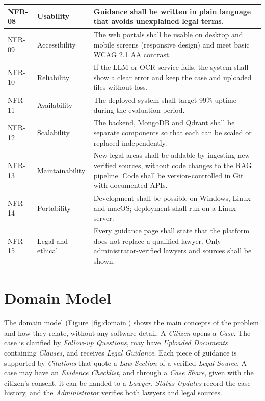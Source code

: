 \documentclass[12pt,a4paper]{report}
\begin{document}
\begin{longtable}{|p{1.5cm}|L{2.6cm}|L{10.1cm}|}
NFR-08 & Usability & Guidance shall be written in plain language that avoids unexplained legal terms. \\ \hline
NFR-09 & Accessibility & The web portals shall be usable on desktop and mobile screens (responsive design) and meet basic WCAG 2.1 AA contrast. \\ \hline
NFR-10 & Reliability & If the LLM or OCR service fails, the system shall show a clear error and keep the case and uploaded files without loss. \\ \hline
NFR-11 & Availability & The deployed system shall target 99\% uptime during the evaluation period. \\ \hline
NFR-12 & Scalability & The backend, MongoDB and Qdrant shall be separate components so that each can be scaled or replaced independently. \\ \hline
NFR-13 & Maintainability & New legal areas shall be addable by ingesting new verified sources, without code changes to the RAG pipeline. Code shall be version-controlled in Git with documented APIs. \\ \hline
NFR-14 & Portability & Development shall be possible on Windows, Linux and macOS; deployment shall run on a Linux server. \\ \hline
NFR-15 & Legal and ethical & Every guidance page shall state that the platform does not replace a qualified lawyer. Only administrator-verified lawyers and sources shall be shown. \\ \hline
\end{longtable}

\section{Domain Model}\label{sec:domain}
The domain model (Figure~\ref{fig:domain}) shows the main concepts of the problem and how they relate, without any software detail. A \emph{Citizen} opens a \emph{Case}. The case is clarified by \emph{Follow-up Questions}, may have \emph{Uploaded Documents} containing \emph{Clauses}, and receives \emph{Legal Guidance}. Each piece of guidance is supported by \emph{Citations} that quote a \emph{Law Section} of a verified \emph{Legal Source}. A case may have an \emph{Evidence Checklist}, and through a \emph{Case Share}, given with the citizen's consent, it can be handed to a \emph{Lawyer}. \emph{Status Updates} record the case history, and the \emph{Administrator} verifies both lawyers and legal sources.
\end{document}
